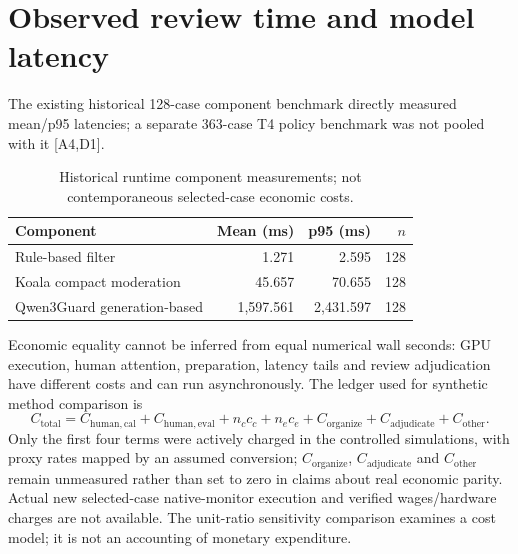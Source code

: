 \documentclass[11pt,a4paper]{article}
\begin{document}
\section{Observed review time and model latency}
The existing historical 128-case component benchmark directly measured mean/p95 latencies; a separate 363-case T4 policy benchmark was not pooled with it [A4,D1].
\begin{table}[H]\centering\small
\caption{Historical runtime component measurements; not contemporaneous selected-case economic costs.}
\begin{tabular}{@{}lrrr@{}}\toprule
Component & Mean (ms) & p95 (ms) & $n$\\\midrule
Rule-based filter & 1.271 & 2.595 & 128\\
Koala compact moderation & 45.657 & 70.655 & 128\\
Qwen3Guard generation-based & 1,597.561 & 2,431.597 & 128\\\bottomrule
\end{tabular}
\end{table}
Economic equality cannot be inferred from equal numerical wall seconds: GPU execution, human attention, preparation, latency tails and review adjudication have different costs and can run asynchronously. The ledger used for synthetic method comparison is
\begin{equation}
 C_{\mathrm{total}}=C_{\mathrm{human,cal}}+C_{\mathrm{human,eval}}+n_c c_c+n_e c_e+C_{\mathrm{organize}}+C_{\mathrm{adjudicate}}+C_{\mathrm{other}}.
\end{equation}
Only the first four terms were actively charged in the controlled simulations, with proxy rates mapped by an assumed conversion; $C_{\mathrm{organize}}$, $C_{\mathrm{adjudicate}}$ and $C_{\mathrm{other}}$ remain unmeasured rather than set to zero in claims about real economic parity. Actual new selected-case native-monitor execution and verified wages/hardware charges are not available. The unit-ratio sensitivity comparison examines a cost model; it is not an accounting of monetary expenditure.
\end{document}
